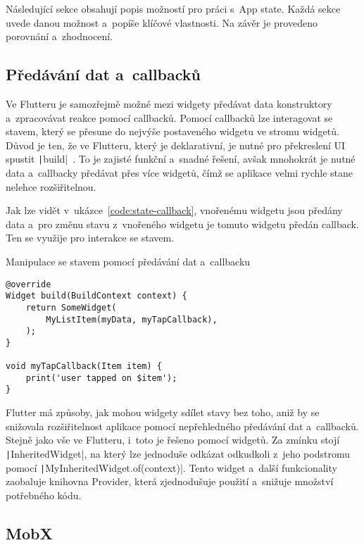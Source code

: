 Následující sekce obsahují popis možností pro práci s~App state.
Každá sekce uvede danou možnost a~popíše klíčové vlastnosti.
Na závěr je provedeno porovnání a~zhodnocení.

\subsection{Předávání dat a~callbacků}
\label{sec:data-callback-transfer}

Ve Flutteru je samozřejmě možné mezi widgety předávat data konstruktory
a~zpracovávat reakce pomocí callbacků. 
Pomocí callbacků lze interagovat se stavem,
který se přesune do nejvýše postaveného widgetu ve stromu widgetů.
Důvod je ten,
že ve Flutteru,
který je deklarativní,
je nutné pro překreslení UI spustit
\texttt|build|~\cite{flutter_state_mgmt_simple}.
To je zajisté funkční a~snadné řešení,
avšak mnohokrát je nutné data a~callbacky předávat přes více widgetů,
čímž se aplikace velmi rychle stane nelehce rozšiřitelnou.

Jak lze vidět v~ukázce~\ref{code:state-callback},
vnořenému widgetu jsou předány data
a~pro změnu stavu z~vnořeného widgetu je tomuto widgetu předán callback.
Ten se využije pro interakce se stavem.

\begin{listing}
    \caption{Manipulace se stavem pomocí předávání dat a~callbacku
\cite{flutter_state_mgmt_simple}}
    \label{code:state-callback}
    \begin{verbatim}
@override
Widget build(BuildContext context) {
    return SomeWidget(
        MyListItem(myData, myTapCallback),
    );
}

void myTapCallback(Item item) {
    print('user tapped on $item');
}
    \end{verbatim}
\end{listing}

Flutter má způsoby,
jak mohou widgety sdílet stavy bez toho,
aniž by se snižovala rozšiřitelnost aplikace pomocí nepřehledného předávání
dat a~callbacků.
Stejně jako vše ve Flutteru,
i~toto je řešeno pomocí widgetů.
Za zmínku stojí \texttt|InheritedWidget|,
na který lze jednoduše odkázat odkudkoli z~jeho \mbox{podstromu} pomocí
\texttt|MyInheritedWidget.of(context)|.
Tento widget a~další funkcionality zaobaluje knihovna Provider,
která zjednodušuje použití a~snižuje množství potřebného
kódu.~\cite{flutter_state_mgmt_simple}

\subsection{MobX}

